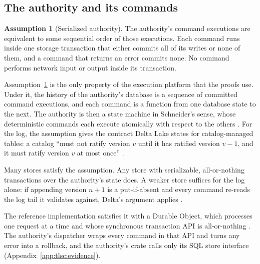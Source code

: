 \documentclass[11pt,letterpaper]{article}
\theoremstyle{definition}
\newtheorem{assumption}[theorem]{Assumption}
\theoremstyle{remark}
\begin{document}
\subsection{The authority and its commands}

\begin{assumption}[Serialized authority]
\label{ass:tlsc:atomic}
The authority's command executions are equivalent to some sequential order of those executions. Each command runs inside one storage transaction that either commits all of its writes or none of them, and a command that returns an error commits none. No command performs network input or output inside its transaction.
\end{assumption}

Assumption~\ref{ass:tlsc:atomic} is the only property of the execution platform that the proofs use. Under it, the history of the authority's database is a sequence of committed command executions, and each command is a function from one database state to the next. The authority is then a state machine in Schneider's sense, whose deterministic commands each execute atomically with respect to the others \cite{schneider1990}. For the log, the assumption gives the contract Delta Lake states for catalog-managed tables: a catalog ``must not ratify version $v$ until it has ratified version $v-1$, and it must ratify version $v$ at most once'' \cite{deltaprotocol}.

Many stores satisfy the assumption. Any store with serializable, all-or-nothing transactions over the authority's state does. A weaker store suffices for the log alone: if appending version $n+1$ is a put-if-absent and every command re-reads the log tail it validates against, Delta's argument applies \cite{armbrust2020delta}.

The reference implementation satisfies it with a Durable Object, which processes one request at a time and whose synchronous transaction API is all-or-nothing \cite{cfdoconcepts,cfdosqlite}. The authority's dispatcher wraps every command in that API and turns any error into a rollback, and the authority's crate calls only its SQL store interface (Appendix~\ref{app:tlsc:evidence}).
\end{document}
